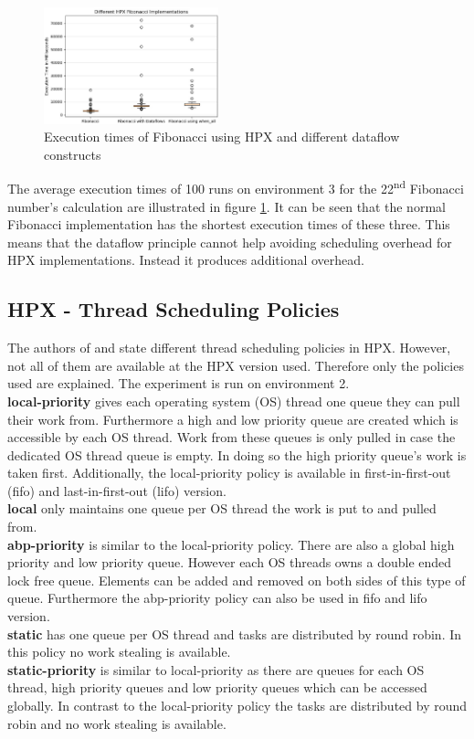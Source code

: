 \begin{figure}[h]
	\centering
	\includegraphics[width=0.45\textwidth]{figures/fibDataflow.JPG}
	\caption{Execution times of Fibonacci using HPX and different dataflow constructs}
	\label{fig:fib_dataflow}
\end{figure}

The average execution times of 100 runs on environment 3 for the 22\textsuperscript{nd} Fibonacci number's calculation are illustrated in figure \ref{fig:fib_dataflow}.
It can be seen that the normal Fibonacci implementation has the shortest execution times of these three.
This means that the dataflow principle cannot help avoiding scheduling overhead for HPX implementations.
Instead it produces additional overhead.


\subsection{HPX - Thread Scheduling Policies}
 The authors of \cite{hpxMP.2019} and \cite{TheSTEARGroup.2020} state different thread scheduling policies in HPX.
 However, not all of them are available at the HPX version used.
 Therefore only the policies used are explained.
 The experiment is run on environment 2.\\
 \textbf{local-priority} gives each operating system (OS) thread one queue they can pull their work from.
 Furthermore a high and low priority queue are created which is accessible by each OS thread.
 Work from these queues is only pulled in case the dedicated OS thread queue is empty.
 In doing so the high priority queue's work is taken first.
 Additionally, the local-priority policy is available in first-in-first-out (fifo) and last-in-first-out (lifo) version.\\
 \textbf{local} only maintains one queue per OS thread the work is put to and pulled from.\\
 \textbf{abp-priority} is similar to the local-priority policy.
 There are also a global high priority and low priority queue.
 However each OS threads owns a double ended lock free queue.
 Elements can be added and removed on both sides of this type of queue.
 Furthermore the abp-priority policy can also be used in fifo and lifo version.\\
 \textbf{static} has one queue per OS thread and tasks are distributed by round robin.
 In this policy no work stealing is available.\\
 \textbf{static-priority} is similar to local-priority as there are queues for each OS thread, high priority queues and low priority queues which can be accessed globally.
 In contrast to the local-priority policy the tasks are distributed by round robin and no work stealing is available.

